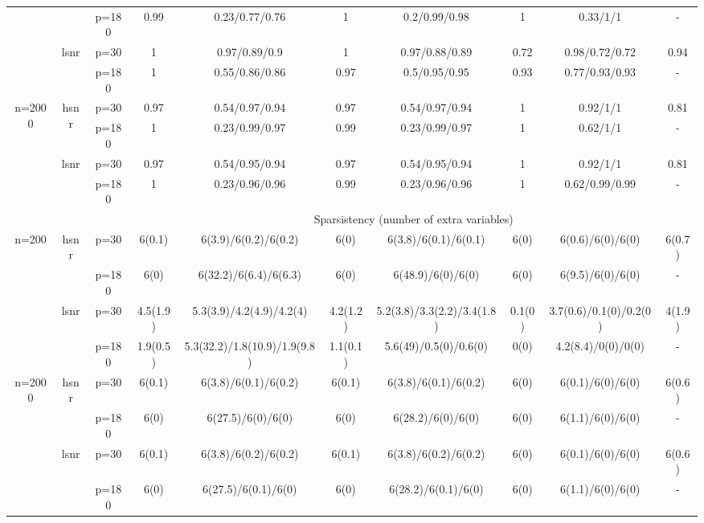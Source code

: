 \begin{table}[ht]
{\begin{tabular}{|c|c|c|cc|cc|cc|c|}
   &  & p=180 & 0.99 & 0.23/0.77/0.76 & 1 & 0.2/0.99/0.98 & 1 & 0.33/1/1 & - \\ 
  \cmidrule{2-10} & \multirow{2}[2]{*}{lsnr} & p=30 & 1 & 0.97/0.89/0.9 & 1 & 0.97/0.88/0.89 & 0.72 & 0.98/0.72/0.72 & 0.94 \\ 
   &  & p=180 & 1 & 0.55/0.86/0.86 & 0.97 & 0.5/0.95/0.95 & 0.93 & 0.77/0.93/0.93 & - \\ 
  \midrule \multirow{4}[4]{*}{n=2000} & \multirow{2}[2]{*}{hsnr} & p=30 & 0.97 & 0.54/0.97/0.94 & 0.97 & 0.54/0.97/0.94 & 1 & 0.92/1/1 & 0.81 \\ 
   &  & p=180 & 1 & 0.23/0.99/0.97 & 0.99 & 0.23/0.99/0.97 & 1 & 0.62/1/1 & - \\ 
  \cmidrule{2-10} & \multirow{2}[2]{*}{lsnr} & p=30 & 0.97 & 0.54/0.95/0.94 & 0.97 & 0.54/0.95/0.94 & 1 & 0.92/1/1 & 0.81 \\ 
   &  & p=180 & 1 & 0.23/0.96/0.96 & 0.99 & 0.23/0.96/0.96 & 1 & 0.62/0.99/0.99 & - \\ 
   \midrule 
 \multicolumn{1}{|r}{} & \multicolumn{1}{r}{} &       & \multicolumn{7}{c|}{Sparsistency (number of extra variables)} \\
 \midrule 
\multirow{4}[4]{*}{n=200} & \multirow{2}[2]{*}{hsnr} & p=30 & 6(0.1) & 6(3.9)/6(0.2)/6(0.2) & 6(0) & 6(3.8)/6(0.1)/6(0.1) & 6(0) & 6(0.6)/6(0)/6(0) & 6(0.7) \\ 
   &  & p=180 & 6(0) & 6(32.2)/6(6.4)/6(6.3) & 6(0) & 6(48.9)/6(0)/6(0) & 6(0) & 6(9.5)/6(0)/6(0) & - \\ 
  \cmidrule{2-10} & \multirow{2}[2]{*}{lsnr} & p=30 & 4.5(1.9) & 5.3(3.9)/4.2(4.9)/4.2(4) & 4.2(1.2) & 5.2(3.8)/3.3(2.2)/3.4(1.8) & 0.1(0) & 3.7(0.6)/0.1(0)/0.2(0) & 4(1.9) \\ 
   &  & p=180 & 1.9(0.5) & 5.3(32.2)/1.8(10.9)/1.9(9.8) & 1.1(0.1) & 5.6(49)/0.5(0)/0.6(0) & 0(0) & 4.2(8.4)/0(0)/0(0) & - \\ 
  \midrule \multirow{4}[4]{*}{n=2000} & \multirow{2}[2]{*}{hsnr} & p=30 & 6(0.1) & 6(3.8)/6(0.1)/6(0.2) & 6(0.1) & 6(3.8)/6(0.1)/6(0.2) & 6(0) & 6(0.1)/6(0)/6(0) & 6(0.6) \\ 
   &  & p=180 & 6(0) & 6(27.5)/6(0)/6(0) & 6(0) & 6(28.2)/6(0)/6(0) & 6(0) & 6(1.1)/6(0)/6(0) & - \\ 
  \cmidrule{2-10} & \multirow{2}[2]{*}{lsnr} & p=30 & 6(0.1) & 6(3.8)/6(0.2)/6(0.2) & 6(0.1) & 6(3.8)/6(0.2)/6(0.2) & 6(0) & 6(0.1)/6(0)/6(0) & 6(0.6) \\ 
   &  & p=180 & 6(0) & 6(27.5)/6(0.1)/6(0) & 6(0) & 6(28.2)/6(0.1)/6(0) & 6(0) & 6(1.1)/6(0)/6(0) & - \\ 
   \bottomrule 
\end{tabular}
}
\end{table}
